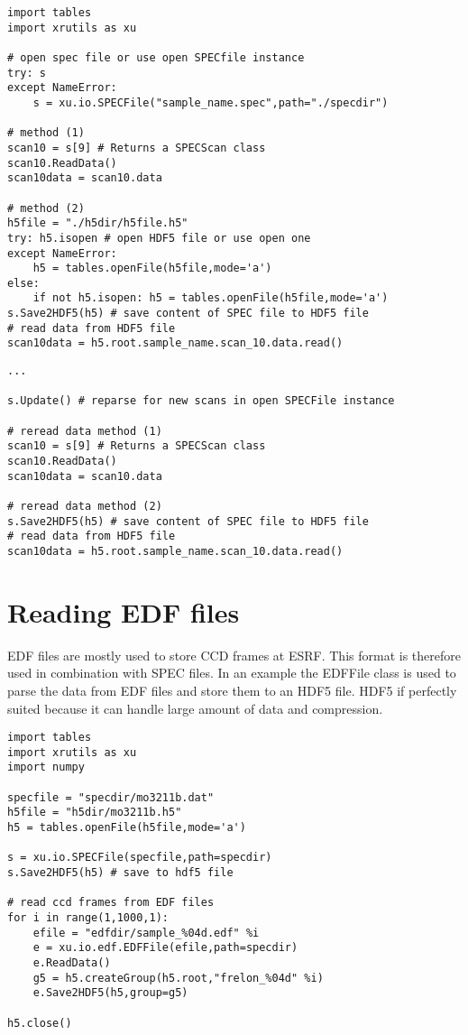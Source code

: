 \begin{lstlisting}[caption=parsing a SPEC file and read data (1) or dumping the data to an HDF5 file (2)]
import tables
import xrutils as xu

# open spec file or use open SPECfile instance
try: s
except NameError:
    s = xu.io.SPECFile("sample_name.spec",path="./specdir")

# method (1)
scan10 = s[9] # Returns a SPECScan class
scan10.ReadData()
scan10data = scan10.data

# method (2)
h5file = "./h5dir/h5file.h5"
try: h5.isopen # open HDF5 file or use open one
except NameError:
    h5 = tables.openFile(h5file,mode='a')
else:
    if not h5.isopen: h5 = tables.openFile(h5file,mode='a')
s.Save2HDF5(h5) # save content of SPEC file to HDF5 file
# read data from HDF5 file
scan10data = h5.root.sample_name.scan_10.data.read()
\end{lstlisting}

\begin{lstlisting}[caption=reparse the SPEC file for new scans and reread the scans (1) or update the HDF5 file(2)]
...

s.Update() # reparse for new scans in open SPECFile instance

# reread data method (1)
scan10 = s[9] # Returns a SPECScan class
scan10.ReadData()
scan10data = scan10.data 

# reread data method (2)
s.Save2HDF5(h5) # save content of SPEC file to HDF5 file
# read data from HDF5 file
scan10data = h5.root.sample_name.scan_10.data.read()
\end{lstlisting}

\section{Reading EDF files}

EDF files are mostly used to store CCD frames at ESRF. This format is therefore used in combination with SPEC files. In an example the EDFFile class is used to parse the data from EDF files and store them to an HDF5 file. HDF5 if perfectly suited because it can handle large amount of data and compression.

\begin{lstlisting}[caption=script to parse and plot a reciprocal space map recorded with Seifert's XRD control software]
import tables 
import xrutils as xu
import numpy

specfile = "specdir/mo3211b.dat"
h5file = "h5dir/mo3211b.h5"
h5 = tables.openFile(h5file,mode='a')

s = xu.io.SPECFile(specfile,path=specdir)
s.Save2HDF5(h5) # save to hdf5 file

# read ccd frames from EDF files
for i in range(1,1000,1):
    efile = "edfdir/sample_%04d.edf" %i
    e = xu.io.edf.EDFFile(efile,path=specdir)
    e.ReadData()
    g5 = h5.createGroup(h5.root,"frelon_%04d" %i)
    e.Save2HDF5(h5,group=g5)

h5.close()
\end{lstlisting}

